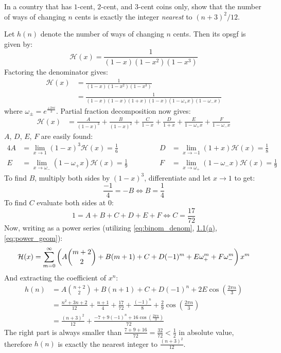 \begin{exercise}
    In a country that has $1$-cent, $2$-cent, and $3$-cent coins only, show that the number of ways of changing $n$ cents is exactly the integer \emph{nearest} to $(n+3)^2/12$.
\end{exercise}
\begin{solution}
    Let $h(n)$ denote the number of ways of changing $n$ cents. Then its opsgf is given by:
    \[
        \mathcal{H}(x) = \frac{1}{(1-x)(1-x^2)(1-x^3)}  
    \]
    Factoring the denominator gives:
    \begin{align*}
        \mathcal{H}(x) &= \frac{1}{(1-x)(1-x^2)(1-x^3)} \\
        &= \frac{1}{(1-x)(1-x)(1+x)(1-x)(1-\omega_+ x)(1-\omega_-x)}
    \end{align*}
    where $\omega_{\pm} = e^{\frac{\pm2\pi i}{3}}$. Partial fraction decomposition now gives:
    \begin{align*}
        \mathcal{H}(x) &= \frac{A}{(1-x)^3} + \frac{B}{(1-x)^2} + \frac{C}{1-x} + \frac{D}{1+x} + \frac{E}{1-\omega_+x} + \frac{F}{1-\omega_-x}
    \end{align*}
    $A$, $D$, $E$, $F$ are easily found:
    \begin{alignat*}{4}
        A &= \lim_{x\to 1}(1-x)^3\mathcal{H}(x) = \frac{1}{6} &&&\qquad D &= \lim_{x\to -1}(1+x)\mathcal{H}(x) = \frac{1}{8} \\
        E &= \lim_{x\to \omega_-}(1-\omega_+x)\mathcal{H}(x) = \frac{1}{9} &&&\qquad  F &= \lim_{x\to\omega_+}(1-\omega_-x)\mathcal{H}(x) = \frac{1}{9}
    \end{alignat*}
    To find $B$, multiply both sides by $(1-x)^3$, differentiate and let $x\to 1$ to get:
    \[
        \frac{-1}{4} = -B \Leftrightarrow B = \frac{1}{4}
    \]
    To find $C$ evaluate both sides at $0$:
    \[
        1 = A + B + C + D + E + F \Leftrightarrow C = \frac{17}{72}
    \]
    Now, writing as a power series (utilizing \eqref{eq:binom_denom}, \hyperlink{eq:ch1:1:a}{1.1(a)}, \eqref{eq:power_geom}):
    \[
        \mathcal{H}(x) = \bsum[m] \left(A\binom{m+2}{2} + B(m+1) + C + D(-1)^m + E\omega_+^m + F\omega_-^m\right)x^m
    \]
    And extracting the coefficient of $x^n$:
    \begin{align*}
        h(n) &= A\binom{n+2}{2}+B(n+1)+C+D(-1)^n + 2E\cos\left(\frac{2\pi n}{3}\right) \\
        &= \frac{n^2+3n+2}{12} +  \frac{n+1}{4} + \frac{17}{72} + \frac{(-1)^n}{8} + \frac{2}{9}\cos\left(\frac{2\pi n}{3}\right) \\
        &= \frac{(n+3)^2}{12} + \frac{-7 + 9(-1)^n + 16\cos\left(\frac{2\pi n}{3}\right)}{72}
    \end{align*}
    The right part is always smaller than $\frac{7+9+16}{72} = \frac{32}{72} < \frac{1}{2}$ in absolute value, therefore $h(n)$ is exactly the nearest integer to $\frac{(n+3)^2}{12}$.
\end{solution}

